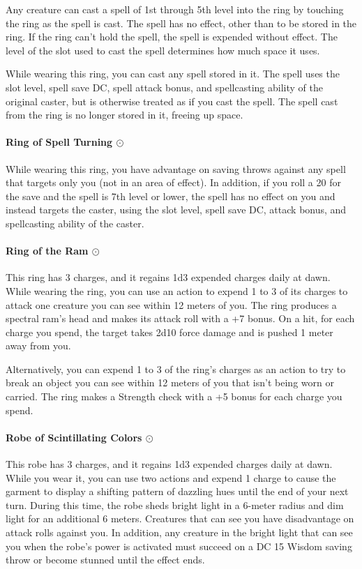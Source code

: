         Any creature can cast a spell of 1st through 5th level into the ring by touching the ring as the spell is cast.
        The spell has no effect, other than to be stored in the ring.
        If the ring can't hold the spell, the spell is expended without effect.
        The level of the slot used to cast the spell determines how much space it uses.

        While wearing this ring, you can cast any spell stored in it.
        The spell uses the slot level, spell save DC, spell attack bonus, and spellcasting ability of the original caster, but is otherwise treated as if you cast the spell.
        The spell cast from the ring is no longer stored in it, freeing up space.
    \paragraph{Ring of Spell Turning $\odot$}
        While wearing this ring, you have advantage on saving throws against any spell that targets only you (not in an area of effect).
        In addition, if you roll a 20 for the save and the spell is 7th level or lower, the spell has no effect on you and instead targets the caster, using the slot level, spell save DC, attack bonus, and spellcasting ability of the caster.
    \paragraph{Ring of the Ram $\odot$}
        This ring has 3 charges, and it regains 1d3 expended charges daily at dawn.
        While wearing the ring, you can use an action to expend 1 to 3 of its charges to attack one creature you can see within 12 meters of you.
        The ring produces a spectral ram's head and makes its attack roll with a +7 bonus.
        On a hit, for each charge you spend, the target takes 2d10 force damage and is pushed 1 meter away from you.

        Alternatively, you can expend 1 to 3 of the ring's charges as an action to try to break an object you can see within 12 meters of you that isn't being worn or carried.
        The ring makes a Strength check with a +5 bonus for each charge you spend.
    \paragraph{Robe of Scintillating Colors $\odot$}
        This robe has 3 charges, and it regains 1d3 expended charges daily at dawn.
        While you wear it, you can use two actions and expend 1 charge to cause the garment to display a shifting pattern of dazzling hues until the end of your next turn.
        During this time, the robe sheds bright light in a 6-meter radius and dim light for an additional 6 meters.
        Creatures that can see you have disadvantage on attack rolls against you.
        In addition, any creature in the bright light that can see you when the robe's power is activated must succeed on a DC 15 Wisdom saving throw or become stunned until the effect ends.
